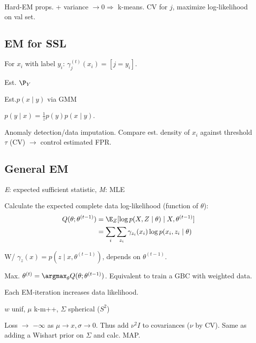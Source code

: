 Hard-EM props. + variance \(\to 0 \Rightarrow\) k-means.
CV for \(j\), maximize log-likelihood on val set.

\subsection{EM for SSL}
\begin{definition}[E-Step]
  For \(x_i\) with label \(y_i\): \(\gamma_j^{(t)}(x_i) = [j = y_i]\).
\end{definition}
\begin{definition}[GM Bayes Cl.]
  \begin{enumerate*}
    \item Est. \(\P_Y\)
    \item Est.\(p(x \mid y)\) via GMM
    \item \(p(y \mid x) = \frac{1}{z}p(y)p(x \mid y)\).
  \end{enumerate*}
\end{definition}

\begin{definition}
  Anomaly detection/data imputation.  Compare est. density of \(x_i\) against threshold \(\tau\) (CV) \(\to\) control estimated FPR.
\end{definition}

\subsection{General EM}
\textit{E}: expected sufficient statistic, \textit{M}: MLE

\begin{definition}[E-Step]
  Calculate the expected complete data log-likelihood (function of \(\theta\)):
  \begin{align*}
    Q(\theta; \theta^{(t-1)}) &= \E_Z[\log p(X, Z \mid \theta) \mid X, \theta^{(t-1)}] \\
    &= \sum_i \sum_{z_i} \gamma_{z_i}(x_i) \log p(x_i, z_i \mid \theta)
  \end{align*}

  W/ \(\gamma_z(x) = p(z \mid x, \theta^{(t-1)})\), depends on \(\theta^{(t-1)}\).
\end{definition}

\begin{definition}[M-Step]
  Max. \(\theta^{(t)} = \argmax_\theta Q(\theta; \theta^{(t-1)})\). Equivalent to train a GBC with weighted data. 
\end{definition}

Each EM-iteration increases data likelihood.

\begin{definition}[EM-Init]
  \(w\) unif, \(\mu\) k-m++, \(\Sigma\) spherical (\(S^2\))
\end{definition}

\begin{definition}[Degeneracy]
  Loss \(\to\) \(-\infty\) as \(\mu \to x, \sigma \to 0\). Thus add \(\nu^2I\) to covariances (\(\nu\) by CV). Same as adding a Wishart prior on \(\Sigma\) and calc. MAP.
\end{definition}
